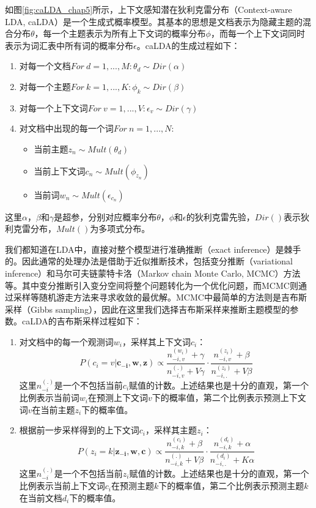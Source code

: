 \documentclass[master]{njuthesis}
\begin{document}
如图\ref{fig:caLDA_chap5}所示，上下文感知潜在狄利克雷分布（Context-aware LDA, caLDA）是一个生成式概率模型。其基本的思想是文档表示为隐藏主题的混合分布$\theta$，每一个主题表示为所有上下文词的概率分布$\phi$，而每一个上下文词同时表示为词汇表中所有词的概率分布$\epsilon$。caLDA的生成过程如下：
	\begin{enumerate}
	\item 对每一个文档$For\ d=1, ..., M: \theta_{d}\sim Dir(\alpha)$
	\item 对每一个主题$For\ k=1, ..., K: \phi_{k}\sim Dir(\beta)$
	\item 对每一个上下文词$For\ v=1, ..., V: \epsilon_{v}\sim Dir(\gamma)$
	\item 对文档中出现的每一个词$For\ n=1, ..., N:$
		\begin{itemize}
		\item 当前主题$z_{n}\sim Mult(\theta_{d})$
		\item 当前上下文词$c_{n}\sim Mult(\phi_{z_{n}})$
		\item 当前词$w_{n}\sim Mult(\epsilon_{c_{n}})$
		\end{itemize}
	\end{enumerate}
这里$\alpha$，$\beta$和$\gamma$是超参，分别对应概率分布$\theta$，$\phi$和$\epsilon$的狄利克雷先验，$Dir()$表示狄利克雷分布，$Mult()$为多项式分布。

我们都知道在LDA中，直接对整个模型进行准确推断（exact inference）是棘手的\cite{blei2003latent}。因此通常的处理办法是借助于近似推断技术，包括变分推断（variational inference）和马尔可夫链蒙特卡洛（Markov chain Monte Carlo, MCMC）方法等。其中变分推断引入变分空间将整个问题转化为一个优化问题，而MCMC则通过采样等随机游走方法来寻求收敛的最优解。MCMC中最简单的方法则是吉布斯采样（Gibbs sampling），因此在这里我们选择吉布斯采样来推断主题模型的参数\cite{griffiths2004finding}。caLDA的吉布斯采样过程如下：
	\begin{enumerate}
	\item 	对文档中的每一个观测词$w_i$，采样其上下文词$c_i$：
			\begin{equation}\label{eq:caLDA_gb_c_chap5}
			P(c_i=v|\mathbf{c_{-i}, w, z})\propto \frac{n_{-i, v}^{(w_i)}+\gamma}{n_{-i, v}^{(.)}+V\gamma}\cdot \frac{n_{-i, v}^{(z_i)}+\beta}{n_{-i, .}^{(z_i)}+V\beta}
			\end{equation}
	这里$n_{-i}^{(.)}$是一个不包括当前$c_i$赋值的计数。上述结果也是十分的直观，第一个比例表示当前词$w_i$在预测上下文词$v$下的概率值，第二个比例表示预测上下文词$v$在当前主题$z_i$下的概率值。
	\item 	根据前一步采样得到的上下文词$c_i$，采样其主题$z_i$：
			\begin{equation}\label{eq:caLDA_gb_z_chap5}
			P(z_i=k|\mathbf{z_{-i}, w, c})\propto \frac{n_{-i, k}^{(c_i)}+\beta}{n_{-i, k}^{(.)}+V\beta}\cdot \frac{n_{-i, k}^{(d_i)}+\alpha}{n_{-i, .}^{(d_i)}+K\alpha}
			\end{equation}
	这里$n_{-i}^{(.)}$是一个不包括当前$z_i$赋值的计数。上述结果也是十分的直观，第一个比例表示当前上下文词$c_i$在预测主题$k$下的概率值，第二个比例表示预测主题$k$在当前文档$d_i$下的概率值。
	\end{enumerate}
\end{document}
